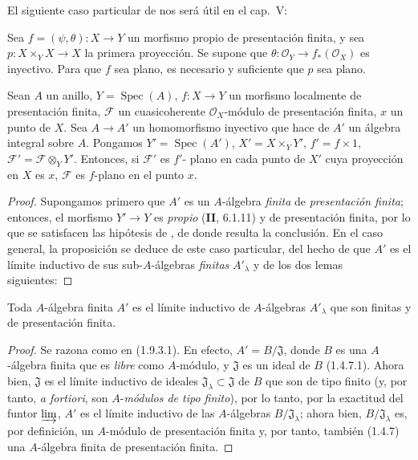 El siguiente caso particular de  nos será útil en el cap.~V:

\begin{corollary}[11.5.4]
\label{IV.11.5.4}
Sea $f=(\psi,\theta):X\to Y$ un morfismo \textup{propio} de presentación finita,
y sea $p:X\times_YX\to X$ la primera proyección. Se supone que $\theta:\mathcal O_Y\to f_*(\mathcal O_X)$ es inyectivo.
Para que $f$ sea plano, es necesario y suficiente que $p$ sea plano.
\end{corollary}

\begin{proposition}[11.5.5]
\label{IV.11.5.5}
Sean $A$ un anillo, $Y=\operatorname{Spec}(A)$, $f:X\to Y$ un morfismo
localmente de presentación finita, $\mathcal F$ un cuasicoherente $\mathcal O_X$-módulo de presentación finita, $x$ un punto
de $X$. Sea $A\to A'$ un homomorfismo inyectivo que hace de $A'$ un álgebra \textup{integral} sobre $A$. Pongamos
$Y'=\operatorname{Spec}(A')$, $X'=X\times_Y Y'$, $f'=f\times1$, $\mathcal F'=\mathcal F\otimes_Y Y'$. Entonces, si $\mathcal F'$ es $f'$- plano en \textup{cada} punto
de $X'$ cuya proyección en $X$ es $x$, $\mathcal F$ es $f$-plano en el punto $x$.
\end{proposition}

\begin{proof}
Supongamos primero que $A'$ es un $A$-álgebra \emph{finita} de \emph{presentación finita}; entonces, el
morfismo $Y'\to Y$ es \emph{propio} (\textbf{II}, 6.1.11) y de presentación finita, por lo que se satisfacen las hipótesis
de , de donde resulta la conclusión. En el caso general, la proposición se deduce
de este caso particular, del hecho de que $A'$ es el límite inductivo de sus sub-$A$-álgebras \emph{finitas}
$A'_\lambda$ y de los dos lemas siguientes:
\end{proof}

\begin{lemma}[11.5.5.1]
\label{IV.11.5.5.1}
Toda $A$-álgebra finita $A'$ es el límite inductivo de $A$-álgebras $A'_\lambda$
que son finitas y de presentación finita.
\end{lemma}

\begin{proof}
Se razona como en (1.9.3.1). En efecto, $A'=B/\mathfrak J$, donde $B$ es una $A$-álgebra finita
que es \emph{libre} como $A$-módulo, y $\mathfrak J$ es un ideal de $B$ (1.4.7.1). Ahora bien, $\mathfrak J$ es el
límite inductivo de ideales $\mathfrak J_\lambda\subset\mathfrak J$ de $B$ que son de tipo finito (y, por tanto, \emph{a fortiori}, son $A$-\emph{módulos de tipo finito}),
por lo tanto,
por la exactitud del funtor $\varinjlim$, $A'$ es el límite inductivo de las $A$-álgebras $B/\mathfrak J_\lambda$; ahora bien, $B/\mathfrak J_\lambda$
es, por definición, un $A$-módulo de presentación finita y, por tanto, también (1.4.7) una $A$-álgebra finita
de presentación finita.
\end{proof}

